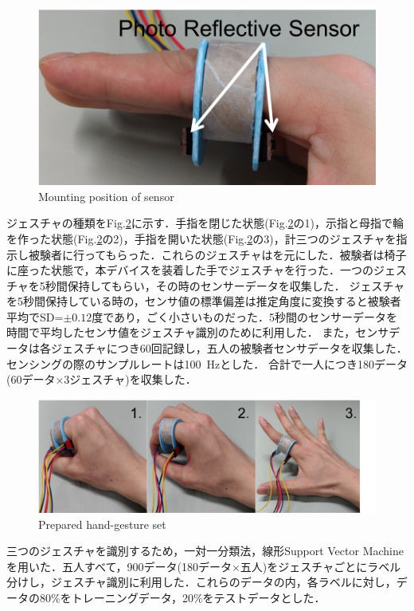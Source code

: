 \begin{figure}[H]
  \centering
  \includegraphics[width=0.6\linewidth]{fig/sensor}
  \caption{Mounting position of sensor}
  \label{fig:sensor}
\end{figure}

ジェスチャの種類をFig.\ref{fig:gesture}に示す．手指を閉じた状態(Fig.\ref{fig:gesture}の1)，示指と母指で輪を作った状態(Fig.\ref{fig:gesture}の2)，手指を開いた状態(Fig.\ref{fig:gesture}の3)，計三つのジェスチャを指示し被験者に行ってもらった．これらのジェスチャは\cite{Lin2015}を元にした．被験者は椅子に座った状態で，本デバイスを装着した手でジェスチャを行った．一つのジェスチャを5秒間保持してもらい，その時のセンサーデータを収集した．
ジェスチャを5秒間保持している時の，センサ値の標準偏差は推定角度に変換すると被験者平均でSD=$\pm0.12度$であり，ごく小さいものだった．5秒間のセンサーデータを時間で平均したセンサ値をジェスチャ識別のために利用した．
また，センサデータは各ジェスチャにつき60回記録し，五人の被験者センサデータを収集した．センシングの際のサンプルレートは100\ Hzとした．
合計で一人につき180データ(60データ$\times$3ジェスチャ)を収集した．

\begin{figure}[H]
  \centering
  \includegraphics[width=0.8\linewidth]{fig/gesture}
  \caption{Prepared hand-gesture set}
  \label{fig:gesture}
\end{figure}

三つのジェスチャを識別するため，一対一分類法，線形Support Vector Machineを用いた．五人すべて，900データ(180データ$\times$五人)をジェスチャごとにラベル分けし，ジェスチャ識別に利用した．これらのデータの内，各ラベルに対し，データの80\%をトレーニングデータ，20\%をテストデータとした．

